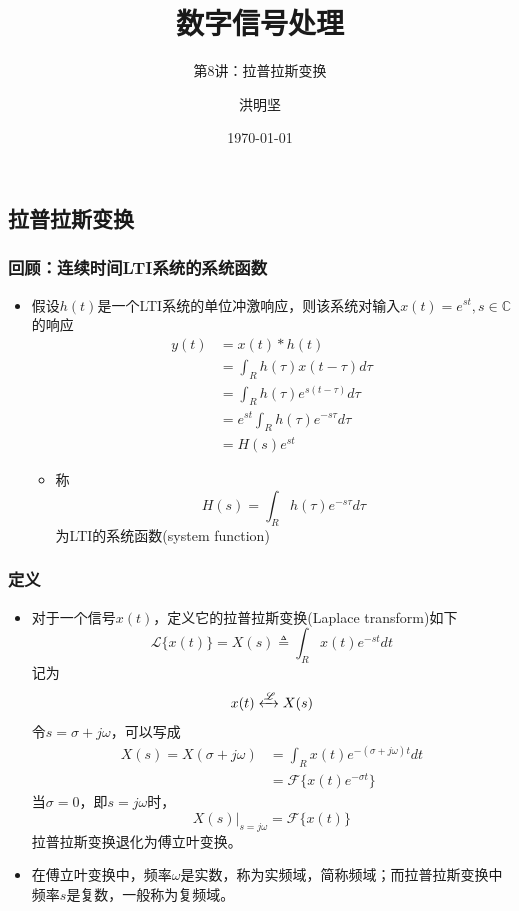 \documentclass[CJKutf8,dvipsnames,table]{beamer}
\title{数字信号处理}
\subtitle{第8讲：拉普拉斯变换}
\author{洪明坚}
\institute{重庆大学软件学院}
\date{\today}
\newif\ifxetexorluatex %
\begin{document}
\ifxetexorluatex\else
\begin{CJK*}{UTF8}{song}  
\fi


  \frame{\titlepage}
  
  \section{拉普拉斯变换}
  
  \begin{frame}
    \frametitle{回顾：连续时间LTI系统的系统函数}
    \begin{itemize}
    \item 假设$h(t)$是一个LTI系统的单位冲激响应，则该系统对输入$x(t)=e^{st}, s \in \mathbb{C}$的响应
    	\begin{align*}
 		y(t) & = x(t) * h(t) \\
		& = \int_R h(\tau)x(t - \tau )d\tau \\
		& = \int_R h(\tau )e^{s(t-\tau )}d\tau    \\
		& = e^{st} \int_R h(\tau)e^{-s\tau}d\tau \\
		& = H(s)e^{st}
    	\end{align*}   
		\begin{itemize}
		\item 称\[ H(s) = \int_R h(\tau)e^{-s\tau}d\tau \] 为LTI的系统函数(system function)
		\end{itemize}
    \end{itemize}
  \end{frame}  
    
  \begin{frame}
    \frametitle{定义}
    \begin{itemize}
    \item 对于一个信号$x(t)$，定义它的拉普拉斯变换(Laplace transform)如下
    \[
	    \mathscr{L}\{x(t)\} = X(s) \triangleq \int_R x(t)e^{-st}dt
    \]
    记为
    \[
    	x(t) \xleftrightarrow{\mathscr{L}} X(s)
    \]
    令$s=\sigma + j\omega$，可以写成
    \begin{align*}
    	X(s) = X(\sigma + j\omega) & = \int_R x(t)e^{-(\sigma + j\omega)t}dt \\
	                        & = \mathscr{F}\{ x(t) e^{-\sigma t} \}
    \end{align*}    
    当$\sigma=0$，即$s=j\omega$时，
    \[
    	\left. X(s) \right\vert_{s=j\omega} = \mathscr{F}\{x(t)\}
    \]
    拉普拉斯变换退化为傅立叶变换。
    \item 在傅立叶变换中，频率$\omega$是实数，称为实频域，简称频域；而拉普拉斯变换中频率$s$是复数，一般称为复频域。
    \end{itemize}
  \end{frame}  
      

\end{CJK*}
\end{document}
